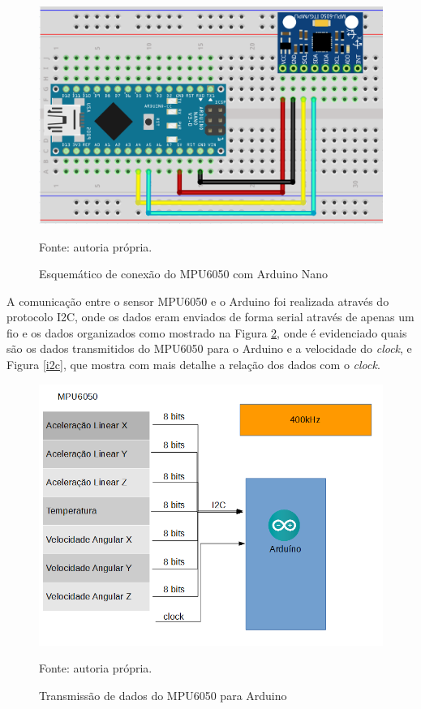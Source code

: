		\begin{figure}[h]
			\centering
			\includegraphics[keepaspectratio=true,scale=0.5]{figuras/conexoes_mpu_arduino.PNG}
			\caption{ Esquemático de conexão do MPU6050 com Arduino Nano }
			Fonte: autoria própria. \footnotesize
			\label{conexoes}	
		\end{figure}
		
		A comunicação entre o sensor MPU6050 e o Arduino foi realizada através do protocolo I2C, onde os dados eram enviados de forma serial através de apenas um fio e os dados organizados como mostrado na Figura \ref{comunicacao}, onde é evidenciado quais são os dados transmitidos do MPU6050 para o Arduino e a velocidade do \textit{clock}, e Figura \ref{i2c}, que mostra com mais detalhe a relação dos dados com o \textit{clock}.
		
		\begin{figure}[h]
			\centering
			\includegraphics[keepaspectratio=true,scale=0.4]{figuras/comunicacao.PNG}
			\caption{ Transmissão de dados do MPU6050 para Arduino}
			Fonte: autoria própria. 
			\label{comunicacao}	
		\end{figure}
		
